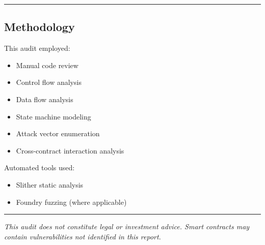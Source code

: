 \documentclass[
]{article}
\providecommand{\tightlist}{%
  \setlength{\itemsep}{0pt}\setlength{\parskip}{0pt}}
\begin{document}
\begin{center}\rule{0.5\linewidth}{0.5pt}\end{center}

\subsection{Methodology}\label{methodology}

This audit employed:

\begin{itemize}
\tightlist
\item
  Manual code review
\item
  Control flow analysis
\item
  Data flow analysis
\item
  State machine modeling
\item
  Attack vector enumeration
\item
  Cross-contract interaction analysis
\end{itemize}

Automated tools used:

\begin{itemize}
\tightlist
\item
  Slither static analysis
\item
  Foundry fuzzing (where applicable)
\end{itemize}

\begin{center}\rule{0.5\linewidth}{0.5pt}\end{center}

\emph{This audit does not constitute legal or investment advice. Smart
contracts may contain vulnerabilities not identified in this report.}
\end{document}
